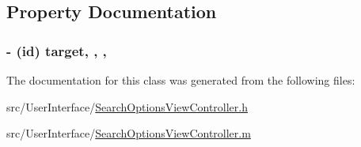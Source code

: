 \subsection{Property Documentation}
\hypertarget{interface_search_options_view_controller_a010e439a502e2d3495a83031b1df484e}{
\subsubsection[{target}]{\setlength{\rightskip}{0pt plus 5cm}-\/ (id) target\hspace{0.3cm}{\ttfamily [read]}, {\ttfamily [write]}, {\ttfamily [atomic]}, {\ttfamily [assign]}}}\label{interface_search_options_view_controller_a010e439a502e2d3495a83031b1df484e}


The documentation for this class was generated from the following files\-:\begin{DoxyCompactItemize}
\item 
src/\-User\-Interface/\hyperlink{_search_options_view_controller_8h}{Search\-Options\-View\-Controller.\-h}\item 
src/\-User\-Interface/\hyperlink{_search_options_view_controller_8m}{Search\-Options\-View\-Controller.\-m}\end{DoxyCompactItemize}

